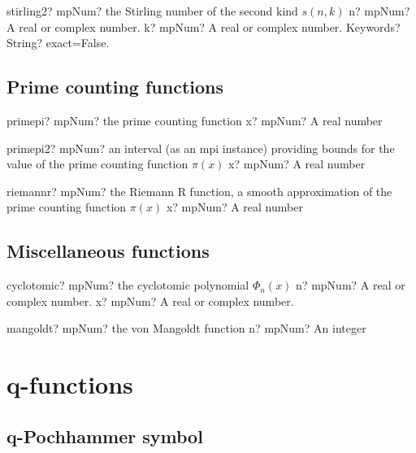 \documentclass[12pt,a4paper,openany]{book}
\begin{document}
\begin{mpFunctionsExtract}
\mpFunctionThree
{stirling2? mpNum? the Stirling number of the second kind $s(n,k)$}
{n? mpNum? A real or complex number.}
{k? mpNum? A real or complex number.}
{Keywords? String? exact=False.}
\end{mpFunctionsExtract}

\section{Prime counting functions}

\begin{mpFunctionsExtract}
\mpFunctionOne
{primepi? mpNum? the prime counting function}
{x? mpNum? A real number}
\end{mpFunctionsExtract}

\begin{mpFunctionsExtract}
\mpFunctionOne
{primepi2? mpNum? an interval (as an mpi instance) providing bounds for the value of the prime counting function $\pi(x)$}
{x? mpNum? A real number}
\end{mpFunctionsExtract}

\begin{mpFunctionsExtract}
\mpFunctionOne
{riemannr? mpNum? the Riemann R function, a smooth approximation of the prime counting function $\pi(x)$}
{x? mpNum? A real number}
\end{mpFunctionsExtract}

\section{Miscellaneous functions}

\begin{mpFunctionsExtract}
\mpFunctionTwo
{cyclotomic? mpNum? the cyclotomic polynomial $\Phi_n(x)$}
{n? mpNum? A real or complex number.}
{x? mpNum? A real or complex number.}
\end{mpFunctionsExtract}

\begin{mpFunctionsExtract}
\mpFunctionOne
{mangoldt? mpNum? the von Mangoldt function}
{n? mpNum? An integer}
\end{mpFunctionsExtract}

\chapter{q-functions}

\section{q-Pochhammer symbol}
\end{document}
